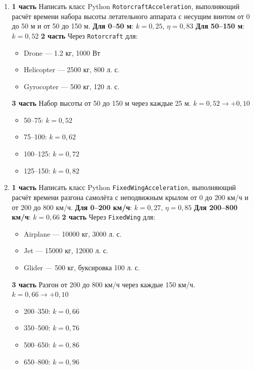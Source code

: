 \begin{enumerate}
    \item[7] \textbf{1 часть}  
    Написать класс Python \texttt{RotorcraftAcceleration}, выполняющий расчёт времени набора высоты летательного аппарата с несущим винтом от 0 до 50 м и от 50 до 150 м.  
    \textbf{Для 0–50 м}: $k = 0{,}25$, $\eta = 0{,}83$  
    \textbf{Для 50–150 м}: $k = 0{,}52$  
    \textbf{2 часть}  
    Через \texttt{Rotorcraft} для:  
    \begin{itemize}
        \item Drone — 1.2 кг, 1000 Вт  
        \item Helicopter — 2500 кг, 800 л. с.  
        \item Gyrocopter — 500 кг, 120 л. с.  
    \end{itemize}
    \textbf{3 часть}  
    Набор высоты от 50 до 150 м через каждые 25 м. $k = 0{,}52 \to +0{,}10$  
    \begin{itemize}
        \item 50–75: $k = 0{,}52$  
        \item 75–100: $k = 0{,}62$  
        \item 100–125: $k = 0{,}72$  
        \item 125–150: $k = 0{,}82$  
    \end{itemize}

    \item[8] \textbf{1 часть}  
    Написать класс Python \texttt{FixedWingAcceleration}, выполняющий расчёт времени разгона самолёта с неподвижным крылом от 0 до 200 км/ч и от 200 до 800 км/ч.  
    \textbf{Для 0–200 км/ч}: $k = 0{,}27$, $\eta = 0{,}85$  
    \textbf{Для 200–800 км/ч}: $k = 0{,}66$  
    \textbf{2 часть}  
    Через \texttt{FixedWing} для:  
    \begin{itemize}
        \item Airplane — 10000 кг, 3000 л. с.  
        \item Jet — 15000 кг, 12000 л. с.  
        \item Glider — 500 кг, буксировка 100 л. с.  
    \end{itemize}
    \textbf{3 часть}  
    Разгон от 200 до 800 км/ч через каждые 150 км/ч. $k = 0{,}66 \to +0{,}10$  
    \begin{itemize}
        \item 200–350: $k = 0{,}66$  
        \item 350–500: $k = 0{,}76$  
        \item 500–650: $k = 0{,}86$  
        \item 650–800: $k = 0{,}96$  
    \end{itemize}


\end{enumerate}
